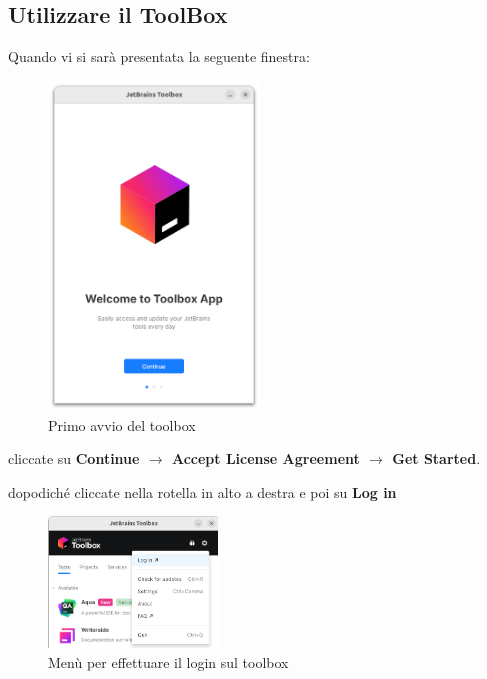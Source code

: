     \subsection{Utilizzare il ToolBox}
        Quando vi si sarà presentata la seguente finestra:
        \begin{figure}[H]
            \centering
            \graphicspath{{src/capitoli/04/img/}}
            \includegraphics[width=0.5\textwidth]{toolbox-primo-avvio.png}
            \caption{Primo avvio del toolbox}
            \label{fig:Primo avvio del toolbox}
        \end{figure}
        cliccate su \textbf{Continue $\rightarrow$ Accept License Agreement $\rightarrow$ Get Started}.
        
        dopodiché cliccate nella rotella in alto a destra e poi su \textbf{Log in}
        \begin{figure}[H]
            \centering
            \graphicspath{{src/capitoli/04/img/}}
            \includegraphics[width=0.4\textwidth]{toolbox-login.png}
            \caption{Menù per effettuare il login sul toolbox}
            \label{fig:Menù per effettuare il login sul toolbox}
        \end{figure}

